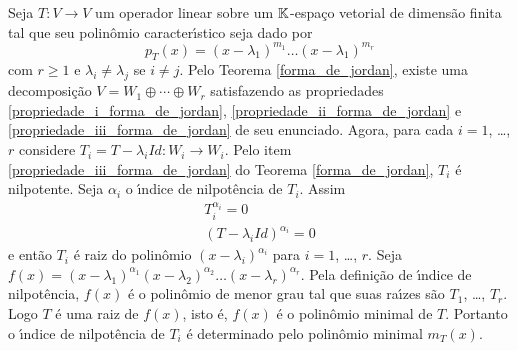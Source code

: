 Seja $T : V \to V$ um operador linear sobre um $\mathbb{K}$-espa\c{c}o vetorial de dimens\~ao finita tal que seu polin\^omio caracter{\'\i}stico seja dado por
\[
	p_T(x) = (x - \lambda_1)^{m_1}\dots(x - \lambda_1)^{m_r}
\]
com $r \ge 1$ e $\lambda_i \ne \lambda_j$ se $i \ne j$. Pelo Teorema \ref{forma_de_jordan}, existe uma decomposi\c{c}\~ao $V = W_1 \oplus \cdots \oplus W_r$ satisfazendo as propriedades \ref{propriedade_i_forma_de_jordan}, \ref{propriedade_ii_forma_de_jordan} e \ref{propriedade_iii_forma_de_jordan} de seu enunciado. Agora, para cada $i = 1$, \dots, $r$ considere $T_i = T - \lambda_i Id : W_i \to W_i$. Pelo item \ref{propriedade_iii_forma_de_jordan} do Teorema \ref{forma_de_jordan}, $T_i$ \'e nilpotente. Seja $\alpha_i$ o {\'\i}ndice de nilpot\^encia de $T_i$. Assim
\begin{align*}
	T_i^{\alpha_i} = 0\\
	(T - \lambda_i Id)^{\alpha_i} = 0
\end{align*}
e ent\~ao $T_i$ \'e raiz do polin\^omio $(x - \lambda_i)^{\alpha_i}$ para $i = 1$, \dots, $r$. Seja $f(x) = (x - \lambda_1)^{\alpha_1} (x - \lambda_2)^{\alpha_2}\dots (x - \lambda_r)^{\alpha_r}$. Pela defini\c{c}\~ao de {\'\i}ndice de nilpot\^encia, $f(x)$ \'e o polin\^omio de menor grau tal que suas ra{\'\i}zes s\~ao $T_1$, \dots, $T_r$. Logo $T$ \'e uma raiz de $f(x)$, isto \'e, $f(x)$ \'e o polin\^omio minimal de $T$. Portanto o {\'\i}ndice de nilpot\^encia de $T_i$ \'e determinado pelo polin\^omio minimal $m_T(x)$.


